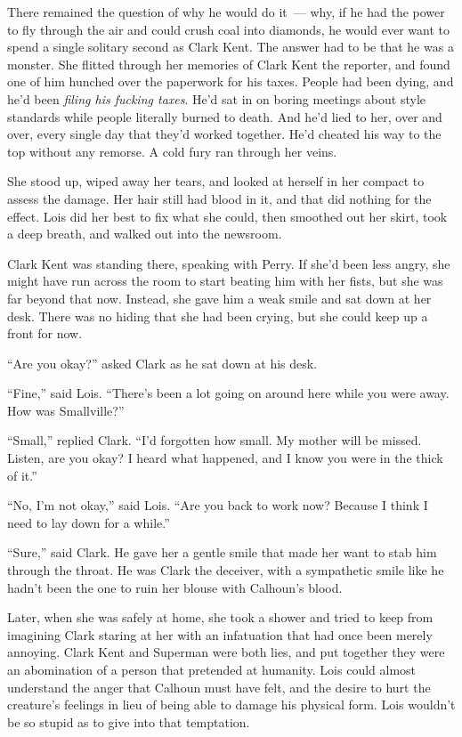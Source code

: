\documentclass[ebook,12pt]{memoir}
\begin{document}
There remained the question of why he would do it~--- why, if he had the
power to fly through the air and could crush coal into diamonds, he
would ever want to spend a single solitary second as Clark Kent. The
answer had to be that he was a monster. She flitted through her memories
of Clark Kent the reporter, and found one of him hunched over the
paperwork for his taxes. People had been dying, and he'd been
\emph{filing his fucking taxes}. He'd sat in on boring meetings about
style standards while people literally burned to death. And he'd lied to
her, over and over, every single day that they'd worked together. He'd
cheated his way to the top without any remorse. A cold fury ran through
her veins.

She stood up, wiped away her tears, and looked at herself in her compact
to assess the damage. Her hair still had blood in it, and that did
nothing for the effect. Lois did her best to fix what she could, then
smoothed out her skirt, took a deep breath, and walked out into the
newsroom.

Clark Kent was standing there, speaking with Perry. If she'd been less
angry, she might have run across the room to start beating him with her
fists, but she was far beyond that now. Instead, she gave him a weak
smile and sat down at her desk. There was no hiding that she had been
crying, but she could keep up a front for now.

``Are you okay?'' asked Clark as he sat down at his desk.

``Fine,'' said Lois. ``There's been a lot going on around here while you
were away. How was Smallville?''

``Small,'' replied Clark. ``I'd forgotten how small. My mother will be
missed. Listen, are you okay? I heard what happened, and I know you were
in the thick of it.''

``No, I'm not okay,'' said Lois. ``Are you back to work now? Because I
think I need to lay down for a while.''

``Sure,'' said Clark. He gave her a gentle smile that made her want to
stab him through the throat. He was Clark the deceiver, with a
sympathetic smile like he hadn't been the one to ruin her blouse with
Calhoun's blood.

Later, when she was safely at home, she took a shower and tried to keep
from imagining Clark staring at her with an infatuation that had once
been merely annoying. Clark Kent and Superman were both lies, and put
together they were an abomination of a person that pretended at
humanity. Lois could almost understand the anger that Calhoun must have
felt, and the desire to hurt the creature's feelings in lieu of being
able to damage his physical form. Lois wouldn't be so stupid as to give
into that temptation.
\end{document}
